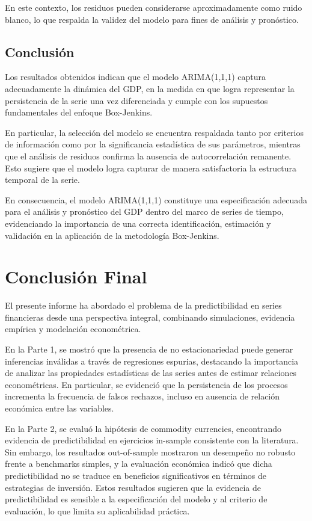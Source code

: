 \documentclass[11pt,a4paper]{article}
\begin{document}
	En este contexto, los residuos pueden considerarse aproximadamente como ruido blanco, lo que respalda la validez del modelo para fines de análisis y pronóstico.
	
	\subsection{Conclusión}
	Los resultados obtenidos indican que el modelo ARIMA(1,1,1) captura adecuadamente la dinámica del GDP, en la medida en que logra representar la persistencia de la serie una vez diferenciada y cumple con los supuestos fundamentales del enfoque Box-Jenkins.
	
	En particular, la selección del modelo se encuentra respaldada tanto por criterios de información como por la significancia estadística de sus parámetros, mientras que el análisis de residuos confirma la ausencia de autocorrelación remanente. Esto sugiere que el modelo logra capturar de manera satisfactoria la estructura temporal de la serie.
	
	En consecuencia, el modelo ARIMA(1,1,1) constituye una especificación adecuada para el análisis y pronóstico del GDP dentro del marco de series de tiempo, evidenciando la importancia de una correcta identificación, estimación y validación en la aplicación de la metodología Box-Jenkins.
	

	
	\section{Conclusión Final}
	
	El presente informe ha abordado el problema de la predictibilidad en series financieras desde una perspectiva integral, combinando simulaciones, evidencia empírica y modelación econométrica. 
	
	En la Parte 1, se mostró que la presencia de no estacionariedad puede generar inferencias inválidas a través de regresiones espurias, destacando la importancia de analizar las propiedades estadísticas de las series antes de estimar relaciones econométricas. En particular, se evidenció que la persistencia de los procesos incrementa la frecuencia de falsos rechazos, incluso en ausencia de relación económica entre las variables.
	
	En la Parte 2, se evaluó la hipótesis de commodity currencies, encontrando evidencia de predictibilidad en ejercicios in-sample consistente con la literatura. Sin embargo, los resultados out-of-sample mostraron un desempeño no robusto frente a benchmarks simples, y la evaluación económica indicó que dicha predictibilidad no se traduce en beneficios significativos en términos de estrategias de inversión. Estos resultados sugieren que la evidencia de predictibilidad es sensible a la especificación del modelo y al criterio de evaluación, lo que limita su aplicabilidad práctica.
	
\end{document}

